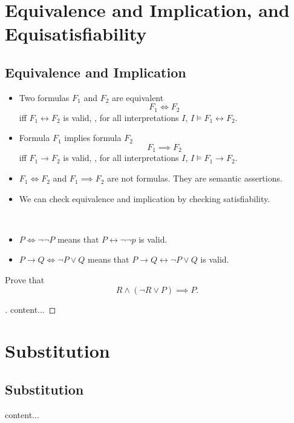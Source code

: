
\cite{youtube:COSE419-Lecture4-1}
\cite{youtube:COSE419-Lecture4-2}
\cite{youtube:COSE419-Lecture4-3}

\section{Equivalence and Implication, and Equisatisfiability}

\subsection{Equivalence and Implication}
\begin{itemize}
	\item Two formulas $F_1$ and $F_2$ are equivalent \[
		F_1\iff F_2
	\] iff $F_1\leftrightarrow F_2$ is valid, \ie, for all interpretations $I$, $I\models F_1\leftrightarrow F_2$.
	\item Formula $F_1$ implies formula $F_2$ \[
	F_1\implies F_2
	\] iff $F_1\to F_2$ is valid, \ie, for all interpretations $I$, $I\models F_1\to F_2$.
	\item $F_1\iff F_2$ and $F_1\implies F_2$ are not formulas. They are semantic assertions.
	\item We can check equivalence and implication by checking satisfiability.
\end{itemize}
\begin{example}
\ \begin{itemize}
	\item $P\iff\lnot\lnot P$ means that $P\leftrightarrow \lnot\lnot p$ is valid.
	\item $P\to Q\iff \lnot P\lor Q$ means that $P\to Q\leftrightarrow \lnot P\lor Q$ is valid.
\end{itemize}
\end{example}
\begin{exercise}
	Prove that \[
	R\land(\lnot R\lor P)\implies P.
	\]
	\begin{proof}[\sol]
		content...
	\end{proof}
\end{exercise}


\section{Substitution}

\subsection{Substitution}
\begin{example}
	content...
\end{example}

